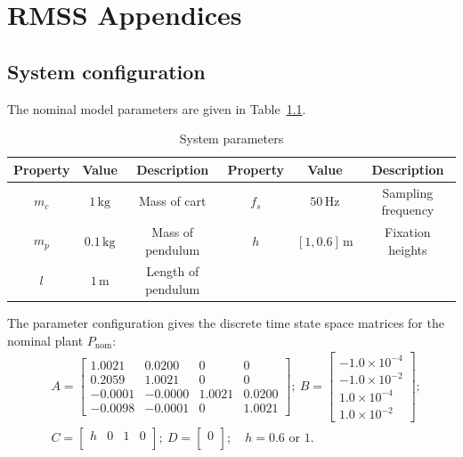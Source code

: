 \chapter{RMSS Appendices}
\label{appsec:RMSS}
\section{System configuration}
The nominal model parameters are given in Table~\ref{tab:sys_config}.
\begin{table}[htbp]
    \caption{System parameters}
    \label{tab:sys_config}
    \centering
    \begin{tabular}{ccc|ccc}
    \hline
    Property & Value & Description & Property & Value & Description \\
    \hline
    $m_c$ & $1\,\mathrm{kg}$ & Mass of cart 
          & $f_s$ & $50\,\mathrm{Hz}$ & Sampling frequency \\
    $m_p$ & $0.1\,\mathrm{kg}$ & Mass of pendulum 
          & $h$ & $[1,0.6]\,\mathrm{m}$ & Fixation heights \\
    $l$   & $1\,\mathrm{m}$ & Length of pendulum 
          &  &  \\
    \hline
    \end{tabular}
\end{table}
The parameter configuration gives the discrete time state space matrices for the nominal plant $P_\mathrm{nom}$:
\begin{equation}
    \begin{split}
    &   A = \left[\begin{array}{cccc}
            1.0021 & 0.0200 & 0 & 0\\
            0.2059 & 1.0021 & 0 & 0\\
           -0.0001 & -0.0000 &  1.0021 & 0.0200 \\
           -0.0098 & -0.0001 &       0 & 1.0021
        \end{array}\right];\ B = \left[\begin{array}{c}
            -1.0\times 10^{-4}\\
            -1.0\times 10^{-2}\\
            1.0\times 10^{-4}\\
            1.0\times 10^{-2}
        \end{array}\right];\\
    &   C = \left[\begin{array}{cccc}
            h & 0 & 1 & 0\\
        \end{array}\right];\ D = \left[\begin{array}{c}
            0\\
        \end{array}\right]; \quad h = 0.6 \text{ or }1.
    \end{split}    
\end{equation}

